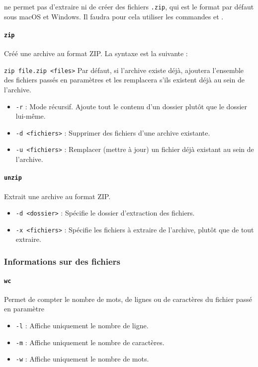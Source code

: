   ne permet pas d'extraire ni de créer des fichiers \texttt{.zip}, qui est le format par défaut sous macOS et Windows. Il faudra pour cela utiliser les commandes  et .

\paragraph{\texttt{zip}} 
Créé une archive au format ZIP. La syntaxe est la suivante : 
\begin{nscenter}
\texttt{zip file.zip <files>}
Par défaut, si l'archive existe déjà,  ajoutera l'ensemble des fichiers passés en paramètres et les remplacera s'ils existent déjà au sein de l'archive.
\end{nscenter}
\begin{itemize}
    \item \texttt{-r} : Mode récursif. Ajoute tout le contenu d'un dossier plutôt que le dossier lui-même.
    \item \texttt{-d <fichiers>} : Supprimer des fichiers d'une archive existante.
    \item \texttt{-u <fichiers>} : Remplacer (mettre à jour) un fichier déjà existant au sein de l'archive.
\end{itemize}

\paragraph{\texttt{unzip}} 
Extrait une archive au format ZIP.
\begin{itemize}
    \item \texttt{-d <dossier>} : Spécifie le dossier d'extraction des fichiers.
    \item \texttt{-x <fichiers>} : Spécifie les fichiers à extraire de l'archive, plutôt que de tout extraire.
\end{itemize}

\newpage

\subsubsection{Informations sur des fichiers}

\paragraph{\texttt{wc}} 
Permet de compter le nombre de mots, de lignes ou de caractères du fichier passé en paramètre
\begin{itemize}
    \item \texttt{-l} : Affiche uniquement le nombre de ligne.
    \item \texttt{-m} : Affiche uniquement le nombre de caractères.
    \item \texttt{-w} : Affiche uniquement le nombre de mots.
\end{itemize}

